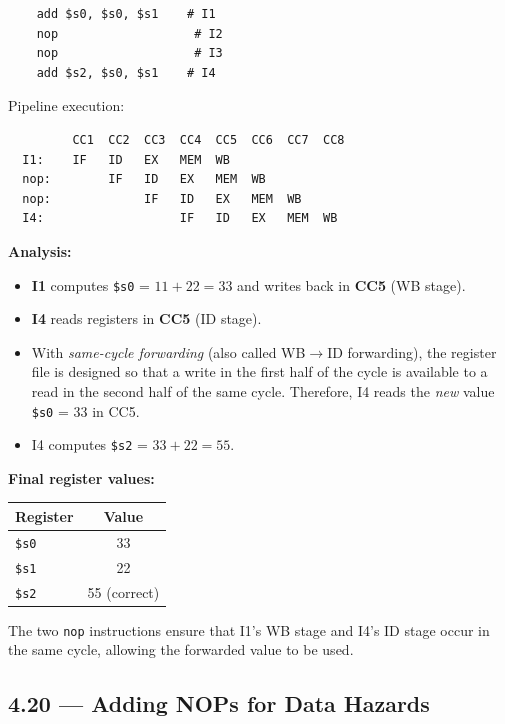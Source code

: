 \begin{verbatim}
    add $s0, $s0, $s1    # I1
    nop                   # I2
    nop                   # I3
    add $s2, $s0, $s1    # I4
\end{verbatim}

Pipeline execution:

\begin{verbatim}
         CC1  CC2  CC3  CC4  CC5  CC6  CC7  CC8
  I1:    IF   ID   EX   MEM  WB
  nop:        IF   ID   EX   MEM  WB
  nop:             IF   ID   EX   MEM  WB
  I4:                   IF   ID   EX   MEM  WB
\end{verbatim}

\noindent\textbf{Analysis:}

\begin{itemize}
  \item \textbf{I1} computes \texttt{\$s0} = $11 + 22 = 33$ and writes back
        in \textbf{CC5} (WB stage).
  \item \textbf{I4} reads registers in \textbf{CC5} (ID stage).
  \item With \emph{same-cycle forwarding} (also called WB$\to$ID forwarding),
        the register file is designed so that a write in the first half of the
        cycle is available to a read in the second half of the same cycle.
        Therefore, I4 reads the \emph{new} value \texttt{\$s0} = 33 in CC5.
  \item I4 computes \texttt{\$s2} = $33 + 22 = 55$.
\end{itemize}

\noindent\textbf{Final register values:}

\begin{center}
\begin{tabular}{lc}
\toprule
\textbf{Register} & \textbf{Value} \\
\midrule
\texttt{\$s0} & 33 \\
\texttt{\$s1} & 22 \\
\texttt{\$s2} & 55 (correct) \\
\bottomrule
\end{tabular}
\end{center}

\noindent The two \texttt{nop} instructions ensure that I1's WB stage and I4's
ID stage occur in the same cycle, allowing the forwarded value to be used.

\subsection*{4.20 --- Adding NOPs for Data Hazards}
\hypertarget{sol-4.20}{}

